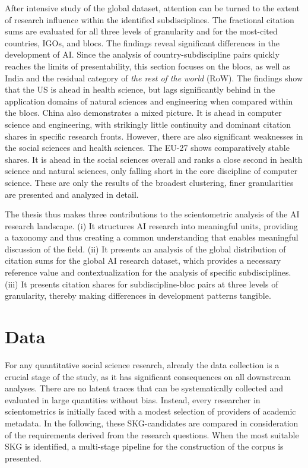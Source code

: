 \documentclass{article}
\begin{document}
	After intensive study of the global dataset, attention can be turned to the extent of research influence within the identified subdisciplines. The fractional citation sums are evaluated for all three levels of granularity and for the most-cited countries, IGOs, and blocs. The findings reveal significant differences in the development of AI. Since the analysis of country-subdiscipline pairs quickly reaches the limits of presentability, this section focuses on the blocs, as well as India and the residual category of \textit{the rest of the world} (RoW). The findings show that the US is ahead in health science, but lags significantly behind in the application domains of natural sciences and engineering when compared within the blocs. China also demonstrates a mixed picture. It is ahead in computer science and engineering, with strikingly  little continuity and dominant citation shares in specific research fronts. However, there are also significant weaknesses in the social sciences and health sciences. The EU-27 shows comparatively stable shares. It is ahead in the social sciences overall and ranks a close second in health science and natural sciences, only falling short in the core discipline of computer science. These are only the results of the broadest clustering, finer granularities are presented and analyzed in detail. 
	
	The thesis thus makes three contributions to the scientometric analysis of the AI research landscape. (i) It structures AI research into meaningful units, providing a taxonomy and thus creating a common understanding that enables meaningful discussion of the field. (ii) It presents an analysis of the global distribution of citation sums for the global AI research dataset, which provides a necessary reference value and contextualization for the analysis of specific subdisciplines. (iii) It presents citation shares for subdiscipline-bloc pairs at three levels of granularity, thereby making differences in development patterns tangible.
	
	
	\section{Data}
	
	For any quantitative social science research, already the data collection is a crucial stage of the study, as it has significant consequences on all downstream analyses. There are no latent traces that can be systematically collected and evaluated in large quantities without bias. Instead, every researcher in scientometrics is initially faced with a modest selection of providers of academic metadata. In the following, these SKG-candidates are compared in consideration of the requirements derived from the research questions. When the most suitable SKG is identified, a multi-stage pipeline for the construction of the corpus is presented.
	
\end{document}
